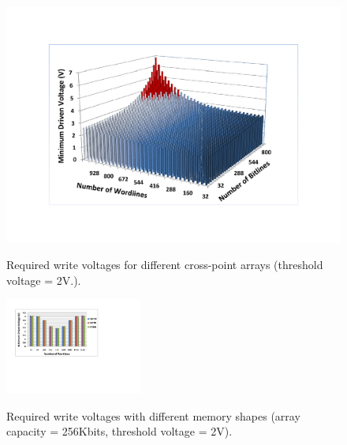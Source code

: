 \begin{figure}%
\centering
\hspace{-5pt}
  \includegraphics[width=2.6 in]{./figures/worst_v_f1.pdf}\\
  \caption{Required write voltages for different cross-point arrays (threshold voltage = 2V.). }\label{fig:worst_v}
  \vspace{-5pt}
\end{figure}


\begin{figure}%
\centering
  \includegraphics[width=0.4\textwidth]{./figures/shape_f.pdf}\\
  \caption{Required write voltages with different memory shapes (array capacity = 256Kbits, threshold voltage = 2V).}\label{fig:shape}
    \vspace{-15pt}
\end{figure}








